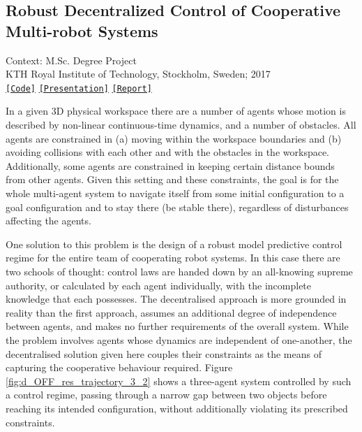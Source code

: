 \subsection{Robust Decentralized Control of Cooperative Multi-robot Systems}

\noindent Context: M.Sc. Degree Project\\
\noindent KTH Royal Institute of Technology, Stockholm, Sweden; 2017\\

\noindent \href{https://github.com/li9i/KTH_thesis_simulations}{\texttt{[Code]}} \href{https://github.com/li9i/KTH_thesis_presentation}{\texttt{[Presentation]}} \href{https://github.com/li9i/KTH_thesis_presentation}{\texttt{[Report]}}\\

\begin{problem}
In a given 3D physical workspace there are a number of agents whose motion is
described by non-linear continuous-time dynamics, and a number of obstacles.
All agents are constrained in (a) moving within the workspace boundaries and
(b) avoiding collisions with each other and with the obstacles in the
workspace. Additionally, some agents are constrained in keeping certain
distance bounds from other agents. Given this setting and these constraints,
the goal is for the whole multi-agent system to navigate itself from some
initial configuration to a goal configuration and to stay there (be stable
there), regardless of disturbances affecting the agents.
\end{problem}

One solution to this problem is the design of a robust model predictive control
regime for the entire team of cooperating robot systems. In this case there are
two schools of thought: control laws are handed down by an all-knowing supreme
authority, or calculated by each agent individually, with the incomplete
knowledge that each possesses. The decentralised approach is more grounded in
reality than the first approach, assumes an additional degree of independence
between agents, and makes no further requirements of the overall system. While
the problem involves agents whose dynamics are independent of one-another, the
decentralised solution given here couples their constraints as the means of
capturing the cooperative behaviour required.  Figure
\ref{fig:d_OFF_res_trajectory_3_2} shows a three-agent system controlled by
such a control regime, passing through a narrow gap between two objects before
reaching its intended configuration, without additionally violating its
prescribed constraints.

